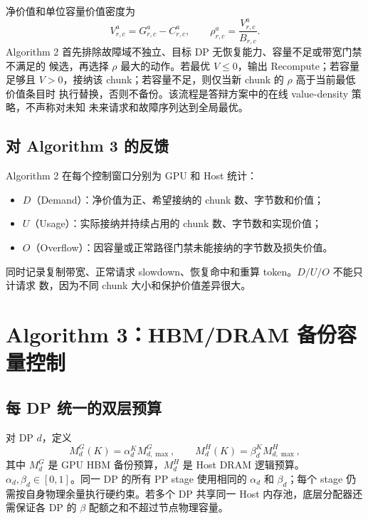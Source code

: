 \documentclass[UTF8,11pt,a4paper]{ctexart}
\begin{document}
净价值和单位容量价值密度为
\begin{equation}
  V_{r,c}^{a}=G_{r,c}^{a}-C_{r,c}^{a},
  \qquad
  \rho_{r,c}^{a}=\frac{V_{r,c}^{a}}{B_{r,c}}.
  \label{eq:value-density}
\end{equation}
Algorithm 2 首先排除故障域不独立、目标 DP 无恢复能力、容量不足或带宽门禁不满足的
候选，再选择 $\rho$ 最大的动作。若最优 $V\le 0$，输出 Recompute；若容量足够且
$V>0$，接纳该 chunk；若容量不足，则仅当新 chunk 的 $\rho$ 高于当前最低价值条目时
执行替换，否则不备份。该流程是答辩方案中的在线 value-density 策略，不声称对未知
未来请求和故障序列达到全局最优。

\subsection{对 Algorithm 3 的反馈}

Algorithm 2 在每个控制窗口分别为 GPU 和 Host 统计：
\begin{itemize}
  \item $D$（Demand）：净价值为正、希望接纳的 chunk 数、字节数和价值；
  \item $U$（Usage）：实际接纳并持续占用的 chunk 数、字节数和实现价值；
  \item $O$（Overflow）：因容量或正常路径门禁未能接纳的字节数及损失价值。
\end{itemize}
同时记录复制带宽、正常请求 slowdown、恢复命中和重算 token。$D/U/O$ 不能只计请求
数，因为不同 chunk 大小和保护价值差异很大。

\section{Algorithm 3：HBM/DRAM 备份容量控制}

\subsection{每 DP 统一的双层预算}

对 DP $d$，定义
\begin{equation}
  M_{d}^{G}(K)=\alpha_d^K M_{d,\max}^{G},
  \qquad
  M_{d}^{H}(K)=\beta_d^K M_{d,\max}^{H},
  \label{eq:alpha-beta}
\end{equation}
其中 $M_{d}^{G}$ 是 GPU HBM 备份预算，$M_{d}^{H}$ 是 Host DRAM 逻辑预算。
$\alpha_d,\beta_d\in[0,1]$。同一 DP 的所有 PP stage 使用相同的 $\alpha_d$ 和
$\beta_d$；每个 stage 仍需按自身物理余量执行硬约束。若多个 DP 共享同一 Host
内存池，底层分配器还需保证各 DP 的 $\beta$ 配额之和不超过节点物理容量。
\end{document}
